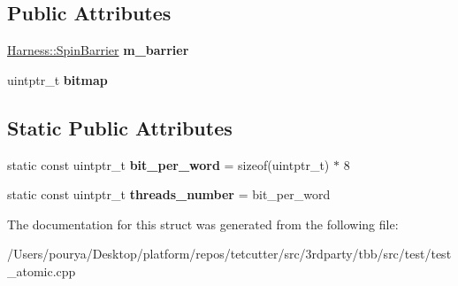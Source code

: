 \subsection*{Public Attributes}
\begin{DoxyCompactItemize}
\item 
\hypertarget{structbit__operation__test__suite_1_1TestAtomicORandANDConcurrently_ab724f4c40e5a1807c44480fd62f5f877}{}\hyperlink{classHarness_1_1SpinBarrier}{Harness\+::\+Spin\+Barrier} {\bfseries m\+\_\+barrier}\label{structbit__operation__test__suite_1_1TestAtomicORandANDConcurrently_ab724f4c40e5a1807c44480fd62f5f877}

\item 
\hypertarget{structbit__operation__test__suite_1_1TestAtomicORandANDConcurrently_a17212a5e07902c9f2ab0803666feb5a9}{}uintptr\+\_\+t {\bfseries bitmap}\label{structbit__operation__test__suite_1_1TestAtomicORandANDConcurrently_a17212a5e07902c9f2ab0803666feb5a9}

\end{DoxyCompactItemize}
\subsection*{Static Public Attributes}
\begin{DoxyCompactItemize}
\item 
\hypertarget{structbit__operation__test__suite_1_1TestAtomicORandANDConcurrently_ab789dcb777435cb7c398d3a0ebc5f735}{}static const uintptr\+\_\+t {\bfseries bit\+\_\+per\+\_\+word} = sizeof(uintptr\+\_\+t) $\ast$ 8\label{structbit__operation__test__suite_1_1TestAtomicORandANDConcurrently_ab789dcb777435cb7c398d3a0ebc5f735}

\item 
\hypertarget{structbit__operation__test__suite_1_1TestAtomicORandANDConcurrently_aad8ac334c06671b28d17f65e0cdaee19}{}static const uintptr\+\_\+t {\bfseries threads\+\_\+number} = bit\+\_\+per\+\_\+word\label{structbit__operation__test__suite_1_1TestAtomicORandANDConcurrently_aad8ac334c06671b28d17f65e0cdaee19}

\end{DoxyCompactItemize}


The documentation for this struct was generated from the following file\+:\begin{DoxyCompactItemize}
\item 
/\+Users/pourya/\+Desktop/platform/repos/tetcutter/src/3rdparty/tbb/src/test/test\+\_\+atomic.\+cpp\end{DoxyCompactItemize}
